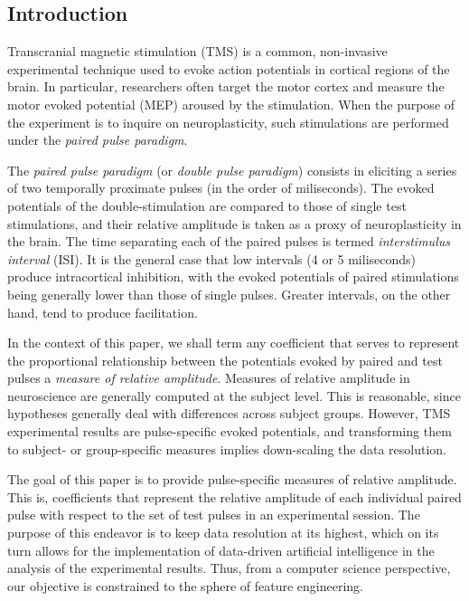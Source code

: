 \documentclass{article}
\begin{document}
 

\begin{multicols}{2}
\section{Introduction}
\newtheorem{definition}{Definition}
\newtheorem{remark}{Remark}

Transcranial magnetic stimulation (TMS) is a common,
non-invasive experimental technique used to evoke action
potentials in cortical regions of the brain. In particular,
researchers often target the motor cortex and measure the
motor evoked potential (MEP) aroused by the stimulation.
When the purpose of the experiment is to inquire on
neuroplasticity, such stimulations are performed under the
\textit{paired pulse paradigm}.

The \textit{paired pulse paradigm} (or \textit{double pulse
paradigm}) consists in eliciting a series of two temporally
proximate pulses (in the order of miliseconds). The evoked
potentials of the double-stimulation are compared to those
of single test stimulations, and their relative amplitude is
taken as a proxy of neuroplasticity in the brain. The time
separating each of the paired pulses is termed
\textit{interstimulus interval} (ISI). It is the general
case that low intervals (4 or 5 miliseconds) produce
intracortical inhibition, with the evoked potentials of
paired stimulations being generally lower than those of
single pulses. Greater intervals, on the other hand, tend to
produce facilitation. 


In the context of this paper, we shall term any coefficient
that serves to represent the proportional relationship
between the potentials evoked by paired and test pulses a
\textit{measure of relative amplitude}. Measures of relative
amplitude in neuroscience are generally computed at the
subject level. This is reasonable, since hypotheses
generally deal with differences across subject groups.
However, TMS experimental results are pulse-specific evoked
potentials, and transforming them to subject- or
group-specific measures implies down-scaling the data resolution. 

The goal of this paper is to provide pulse-specific measures of relative
amplitude. This is, coefficients that represent the relative amplitude of each
individual paired pulse with respect to the set of test pulses in an
experimental session. The purpose of this endeavor is to keep data resolution
at its highest, which on its turn allows for the implementation of data-driven
artificial intelligence in the analysis of the 
experimental results. Thus, from a computer science perspective, our objective is
constrained to the sphere of feature engineering. 


\end{multicols}
\end{document}

